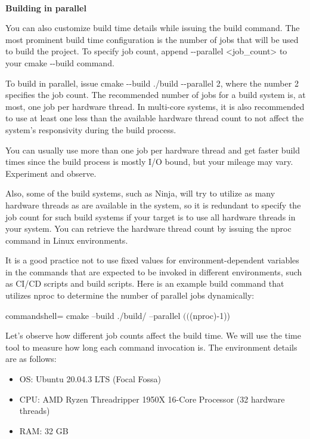 \hspace*{\fill} \\ %
\noindent
\textbf{Building in parallel}

You can also customize build time details while issuing the build command. The most prominent build time configuration is the number of jobs that will be used to build the project. To specify job count, append -{}-parallel <job\_count> to your cmake -{}-build command.

To build in parallel, issue cmake -{}-build ./build -{}-parallel 2, where the number 2 specifies the job count. The recommended number of jobs for a build system is, at most, one job per hardware thread. In multi-core systems, it is also recommended to use at least one less than the available hardware thread count to not affect the system's responsivity during the build process.

\begin{tcolorbox}[colback=webgreen!5!white,colframe=webgreen!75!black,title=Note]
You can usually use more than one job per hardware thread and get faster build times since the build process is mostly I/O bound, but your mileage may vary. Experiment and observe.

Also, some of the build systems, such as Ninja, will try to utilize as many hardware threads as are available in the system, so it is redundant to specify the job count for such build systems if your target is to use all hardware threads in your system. You can retrieve the hardware thread count by issuing the nproc command in Linux environments.
\end{tcolorbox}

It is a good practice not to use fixed values for environment-dependent variables in the commands that are expected to be invoked in different environments, such as CI/CD scripts and build scripts. Here is an example build command that utilizes nproc to determine the number of parallel jobs dynamically:

\begin{tcblisting}{commandshell={}}
cmake --build ./build/ --parallel $(($(nproc)-1))
\end{tcblisting}

Let's observe how different job counts affect the build time. We will use the time tool to measure how long each command invocation is. The environment details are as follows:

\begin{itemize}
\item 
OS: Ubuntu 20.04.3 LTS (Focal Fossa)

\item 
CPU: AMD Ryzen Threadripper 1950X 16-Core Processor (32 hardware threads)

\item 
RAM: 32 GB
\end{itemize}

